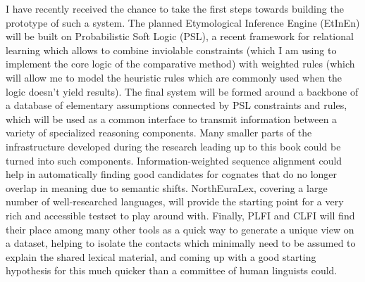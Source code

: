 I have recently received the chance to take the first steps towards building the prototype of such a system. The planned Etymological Inference Engine (EtInEn) will be built on Probabilistic Soft Logic (PSL), a recent framework for relational learning which allows to combine inviolable constraints (which I am using to implement the core logic of the comparative method) with weighted rules (which will allow me to model the heuristic rules which are commonly used when the logic doesn't yield results). The final system will be formed around a backbone of a database of elementary assumptions connected by PSL constraints and rules, which will be used as a common interface to transmit information between a variety of specialized reasoning components. Many smaller parts of the infrastructure developed during the research leading up to this book could be turned into such components.  Information-weighted sequence alignment could help in automatically finding good candidates for cognates that do no longer overlap in meaning due to semantic shifts. NorthEuraLex, covering a large number of well-researched languages, will provide the starting point for a very rich and accessible testset to play around with. Finally, PLFI and CLFI will find their place among many other tools as a quick way to generate a unique view on a dataset, helping to isolate the contacts which minimally need to be assumed to explain the shared lexical material, and coming up with a good starting hypothesis for this much quicker than a committee of human linguists could.
